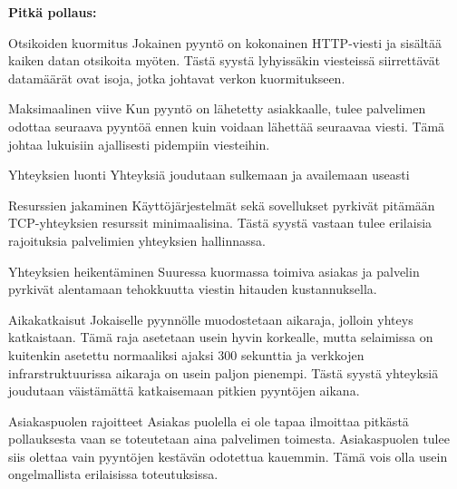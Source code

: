 \documentclass[utf8]{gradu3}
\begin{document}
\textbf{Pitkä pollaus:}
\begin{desclist}
\item[Otsikoiden  kuormitus] Jokainen pyyntö on kokonainen HTTP-viesti ja sisältää kaiken datan otsikoita myöten. Tästä syystä lyhyissäkin viesteissä siirrettävät datamäärät ovat isoja, jotka johtavat verkon kuormitukseen.
\item[Maksimaalinen viive] Kun pyyntö on lähetetty asiakkaalle, tulee palvelimen odottaa seuraava pyyntöä ennen kuin voidaan lähettää seuraavaa viesti. Tämä johtaa lukuisiin ajallisesti pidempiin viesteihin.
\item[Yhteyksien luonti] Yhteyksiä joudutaan sulkemaan ja availemaan useasti
\item[Resurssien jakaminen] Käyttöjärjestelmät sekä sovellukset pyrkivät pitämään TCP-yhteyksien resurssit minimaalisina. Tästä syystä vastaan tulee erilaisia rajoituksia palvelimien yhteyksien hallinnassa.
\item[Yhteyksien heikentäminen] Suuressa kuormassa toimiva asiakas ja palvelin pyrkivät alentamaan tehokkuutta viestin hitauden kustannuksella.
\item[Aikakatkaisut] Jokaiselle pyynnölle muodostetaan aikaraja, jolloin yhteys katkaistaan. Tämä raja asetetaan usein hyvin korkealle, mutta selaimissa on kuitenkin asetettu normaaliksi ajaksi 300 sekunttia ja verkkojen infrarstruktuurissa aikaraja on usein paljon pienempi. Tästä syystä yhteyksiä joudutaan väistämättä katkaisemaan pitkien pyyntöjen aikana.
\item[Asiakaspuolen rajoitteet] Asiakas puolella ei ole tapaa ilmoittaa pitkästä pollauksesta vaan se toteutetaan aina palvelimen toimesta. Asiakaspuolen tulee siis olettaa vain pyyntöjen kestävän odotettua kauemmin. Tämä vois olla usein ongelmallista erilaisissa toteutuksissa.
\end{desclist}
\end{document}
